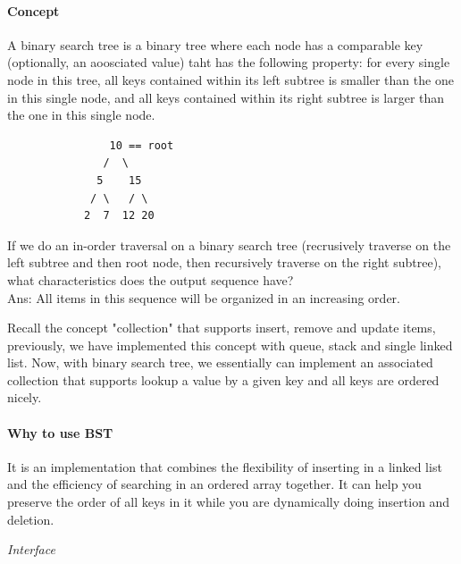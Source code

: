\documentclass[11pt]{article}
\begin{document}
\paragraph{Concept}\label{concept}

A binary search tree is a binary tree where each node has a comparable
key (optionally, an aoosciated value) taht has the following property:
for every single node in this tree, all keys contained within its left
subtree is smaller than the one in this single node, and all keys
contained within its right subtree is larger than the one in this single
node.

\begin{verbatim}
                10 == root
               /  \
              5    15
             / \   / \
            2  7  12 20  
\end{verbatim}

If we do an in-order traversal on a binary search tree (recrusively
traverse on the left subtree and then root node, then recursively
traverse on the right subtree), what characteristics does the output
sequence have?\\
Ans: All items in this sequence will be organized in an increasing
order.

Recall the concept "collection" that supports insert, remove and update
items, previously, we have implemented this concept with queue, stack
and single linked list. Now, with binary search tree, we essentially can
implement an associated collection that supports lookup a value by a
given key and all keys are ordered nicely.

    \paragraph{Why to use BST}\label{why-to-use-bst}

It is an implementation that combines the flexibility of inserting in a
linked list and the efficiency of searching in an ordered array
together. It can help you preserve the order of all keys in it while you
are dynamically doing insertion and deletion.

\emph{Interface}
\end{document}
